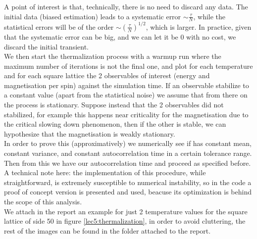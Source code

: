 A point of interest is that, technically, there is no need to discard any data. The initial data (biased estimation) leads to a systematic error $\sim \frac{\tau}{N}$,
while the statistical errors will be of the order $\sim (\frac{\tau}{N})^{1/2}$, which is larger. In practice, given that the systematic error can be big, 
and we can let it be 0 with no cost, we discard the initial transient. \\ 

We then start the thermalization process with a warmup run where the maximum number of iterations is not the final one, and plot for each temperature and for 
each square lattice the 2 observables of interest (energy and magnetisation per spin) against the simulation time. If an observable stabilize to a constant value (apart from the statistical noise) 
we assume that from there on the process is stationary. 
Suppose instead that the 2 observables did not stabilized, for example this happens near criticality for the magnetisation due to the critical slowing down 
phenomenon, then if the other is stable, we can hypothesize that the magnetisation is weakly stationary. \\
In order to prove this (approximatively) we numerically see if has constant mean, constant variance, and constant autocorrelation time in a certain tolerance 
range. Then from this we have our autocorrelation time and proceed as specified before. \\
A technical note here: the implementation of this procedure, while straightforward, is extremely susceptible to numerical instability, 
so in the code a proof of concept version is presented and used, beacuse its optimization is behind the scope of this analysis. \\
We attach in the report an example for just 2 temperature values for the square lattice of side 50 in figure \ref{lec5:thermalization}, in order to avoid cluttering, 
the rest of the images can be found in the folder attached to the report.


